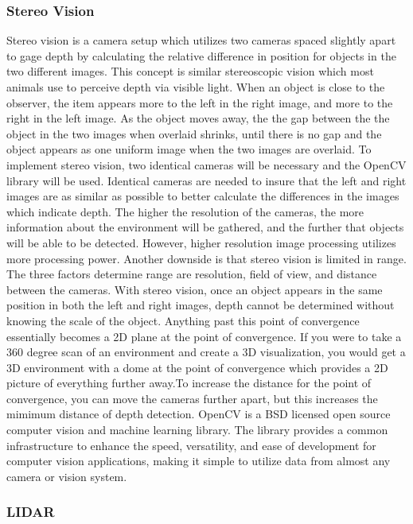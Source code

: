 \documentclass[10pt, oneside,onecolumn]{IEEEtran}
\begin{document}
\begin{titlepage}
\subsubsection{Stereo Vision}

Stereo vision is a camera setup which utilizes two cameras spaced slightly apart to gage depth by calculating the relative difference in position for objects in the two different images. This concept is similar stereoscopic vision which most animals use to perceive depth via visible light. When an object is close to the observer, the item appears more to the left in the right image, and more to the right in the left image. As the object moves away, the the gap between the the object in the two images when overlaid shrinks, until there is no gap and the object appears as one uniform image when the two images are overlaid. 
To implement stereo vision, two identical cameras will be necessary and the OpenCV library will be used. Identical cameras are needed to insure that the left and right images are as similar as possible to better calculate the differences in the images which indicate depth. The higher the resolution of the cameras, the more information about the environment will be gathered, and the further that objects will be able to be detected. However, higher resolution image processing utilizes more processing power. 
Another downside is that stereo vision is limited in range. The three factors determine range are resolution, field of view, and distance between the cameras. With stereo vision, once an object appears in the same position in both the left and right images, depth cannot be determined without knowing the scale of the object. Anything past this point of convergence essentially becomes a 2D plane at the point of convergence. If you were to take a 360 degree scan of an environment and create a 3D visualization, you would get a 3D environment with a dome at the point of convergence which provides a 2D picture of everything further away.To increase the distance for the point of convergence, you can move the cameras further apart, but this increases the mimimum distance of depth detection. 
OpenCV is a BSD licensed open source computer vision and machine learning library. The library provides a common infrastructure to enhance the speed, versatility, and ease of development for computer vision applications, making it simple to utilize data from almost any camera or vision system. 

\subsubsection{LIDAR}


\end{titlepage}
\end{document}
